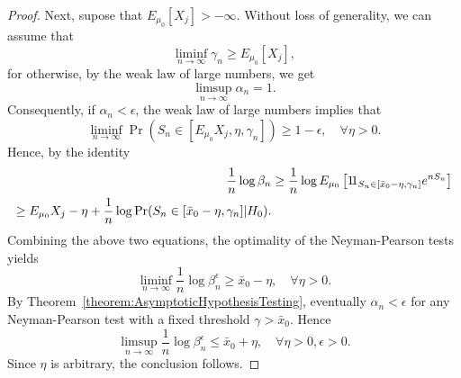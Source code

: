 \begin{proof}
Next, supose that $E_{\mu_0} [X_j] > - \infty$.
Without loss of generality, we can assume that
\begin{equation*}
\liminf_{n \rightarrow \infty} \gamma_n \geq E_{\mu_0} [X_j],
\end{equation*}
for otherwise, by the weak law of large numbers, we get
\begin{equation*}
\limsup_{n \rightarrow \infty} \alpha_n = 1 .
\end{equation*}
Consequently, if $\alpha_n < \epsilon$, the weak law of large numbers implies that
\begin{equation*}
\liminf_{n \rightarrow \infty} \Pr (S_n \in [ E_{\mu_0} X_j, \eta, \gamma_n]) \geq 1 - \epsilon, \quad \forall \eta > 0 .
\end{equation*}
Hence, by the identity
\begin{equation*}
\begin{split}
\frac{1}{n} \log \beta_n
&\geq \frac{1}{n} \log E_{\mu_0} \left[ \mathrm{1\!1}_{ S_n \in [\bar{x}_0 - \eta, \gamma_n] }
e^{n S_n} \right] \\
\geq E_{\mu_0} X_j - \eta + \frac{1}{n} \log \Pr (S_n \in [\bar{x}_0 - \eta, \gamma_n] | H_0) .
\end{split}
\end{equation*}
Combining the above two equations, the optimality of the Neyman-Pearson tests yields
\begin{equation*}
\liminf_{n \rightarrow \infty} \frac{1}{n} \log \beta_n^{\epsilon}
\geq \bar{x}_0 - \eta, \quad \forall \eta > 0 .
\end{equation*}
By Theorem~\ref{theorem:AsymptoticHypothesisTesting}, eventually $\alpha_n < \epsilon$ for any Neyman-Pearson test with a fixed threshold $\gamma > \bar{x}_0$.
Hence
\begin{equation*}
\limsup_{n \rightarrow \infty} \frac{1}{n} \log \beta_n^{\epsilon}
\leq \bar{x}_0 + \eta, \quad \forall \eta > 0, \epsilon > 0 .
\end{equation*}
Since $\eta$ is arbitrary, the conclusion follows.
\end{proof}

